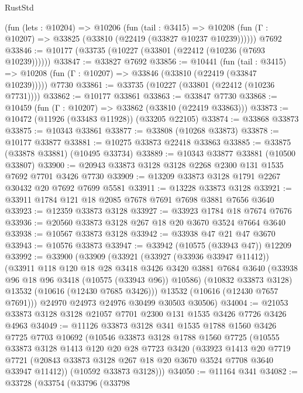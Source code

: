 \begin{lexlean}{RustStd}
\begin{coremodule}
    (fun (lets : @10204) =>
    @10206
      (fun (tail : @3415) =>
      @10208 (fun (Γ : @10207) => @33825 (@33810 (@22419 (@33827 @10237 @10239))))))
    @7692
@33846 := @10177 (@33735 (@10227 (@33801 (@22412 (@10236 (@7693 @10239))))))
@33847 := @33827 @7692
@33856 := @10441
    (fun (tail : @3415) => @10208 (fun (Γ : @10207) => @33846 (@33810 (@22419 (@33847 @10239)))))
    @7730
@33861 := @33735 (@10227 (@33801 (@22412 (@10236 @7731))))
@33862 := @10177 @33861
@33863 := @33847 @7730
@33868 := @10459 (fun (Γ : @10207) => @33862 (@33810 (@22419 @33863)))
@33873 := @10472 (@11926 (@33483 @11928)) (@33205 @22105)
@33874 := @33868 @33873
@33875 := @10343 @33861
@33877 := @33808 (@10268 @33873)
@33878 := @10177 @33877
@33881 := @10275 @33873 @22418 @33863
@33885 := @33875 (@33878 @33881) (@10495 @33734)
@33889 := @10343 @33877 @33881 (@10500 @33807)
@33900 := @20943 @33873 @3128 @3128 @2268 @2300 @131 @1535 @7692 @7701 @3426 @7730
@33909 := @13209 @33873 @3128 @1791 @2267 @30432 @20 @7692 @7699 @5581
@33911 := @13228 @33873 @3128
@33921 := @33911 @1784 @121 @18 @2085 @7678 @7691 @7698 @3881 @7656 @3640
@33923 := @12359 @33873 @3128
@33927 := @33923 @1784 @18 @7674 @7676
@33936 := @20560 @33873 @3128 @267 @18 @20 @3670 @3524 @7664 @3640
@33938 := @10567 @33873 @3128
@33942 := @33938 @47 @21 @47 @3670
@33943 := @10576 @33873
@33947 := @33942 (@10575 (@33943 @47)) @12209
@33992 := @33900
    (@33909
      (@33921
        (@33927 (@33936 @33947 @11412))
        (@33911
          @118
          @120
          @18
          @28
          @3418
          @3426
          @3420
          @3881
          @7684
          @3640
          (@33938 @96 @18 @96 @3418 (@10575 (@33943 @96)) @10586)
          (@10832 @33873 @3128)
          @13532
          (@10616 (@12430 @7685 @3426)))
        @13532
        (@10616 (@12430 @7657 @7691)))
      @24970
      @24973
      @24976
      @30499
      @30503
      @30506)
@34004 := @21053 @33873 @3128 @3128 @21057 @7701 @2300 @131 @1535 @3426 @7726 @3426 @4963
@34049 := @11126
    @33873
    @3128
    @341
    @1535
    @1788
    @1560
    @3426
    @7725
    @7703
    @10692
    (@10546
      @33873
      @3128
      @1788
      @1560
      @7725
      (@10555
        @33873
        @3128
        @1413
        @120
        @20
        @28
        @7723
        @3420
        (@33923
          @1413
          @20
          @7719
          @7721
          (@20843 @33873 @3128 @267 @18 @20 @3670 @3524 @7708 @3640 @33947 @11412))
        (@10592 @33873 @3128)))
@34050 := @11164 @341
@34082 := @33728
    (@33754
      (@33796
        (@33798

\end{coremodule}
\end{lexlean}
